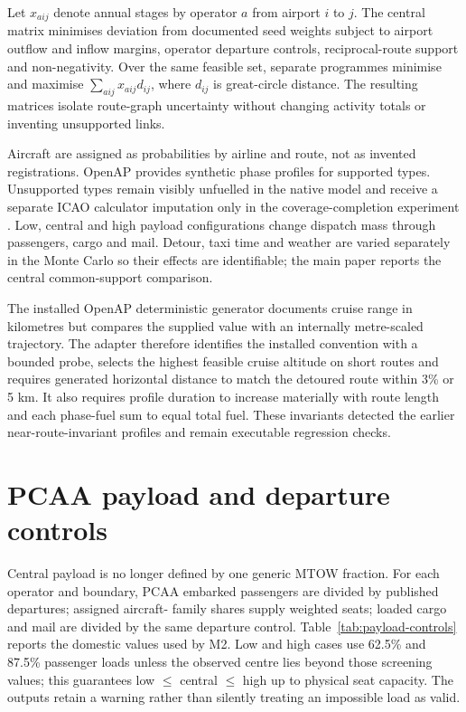 \documentclass[5p,times,authoryear]{elsarticle}
\begin{document}
Let $x_{aij}$ denote annual stages by operator $a$ from airport $i$ to $j$. The central matrix
minimises deviation from documented seed weights subject to airport outflow and inflow margins,
operator departure controls, reciprocal-route support and non-negativity. Over the same
feasible set, separate programmes minimise and maximise $\sum_{aij}x_{aij}d_{ij}$, where
$d_{ij}$ is great-circle distance. The resulting matrices isolate route-graph uncertainty
without changing activity totals or inventing unsupported links.

Aircraft are assigned as probabilities by airline and route, not as invented registrations.
OpenAP \citep{sun2020openap} provides synthetic phase profiles for supported types. Unsupported
types remain visibly unfuelled in the native model and receive a separate ICAO calculator
imputation only in the coverage-completion experiment \citep{icaoicec2024}. Low, central and
high payload configurations change dispatch mass through passengers, cargo and mail. Detour,
taxi time and weather are varied separately in the Monte Carlo so their effects are identifiable;
the main paper reports the central common-support comparison.

The installed OpenAP deterministic generator documents cruise range in kilometres but compares
the supplied value with an internally metre-scaled trajectory. The adapter therefore identifies
the installed convention with a bounded probe, selects the highest feasible cruise altitude on
short routes and requires generated horizontal distance to match the detoured route within 3\%
or 5 km. It also requires profile duration to increase materially with route length and each
phase-fuel sum to equal total fuel. These invariants detected the earlier near-route-invariant
profiles and remain executable regression checks.

\section{PCAA payload and departure controls}

Central payload is no longer defined by one generic MTOW fraction. For each operator and
boundary, PCAA embarked passengers are divided by published departures; assigned aircraft-
family shares supply weighted seats; loaded cargo and mail are divided by the same departure
control. Table~\ref{tab:payload-controls} reports the domestic values used by M2. Low and high
cases use 62.5\% and 87.5\% passenger loads unless the observed centre lies beyond those
screening values; this guarantees low $\leq$ central $\leq$ high up to physical seat capacity.
The outputs retain a warning rather than silently treating an impossible load as valid.
\end{document}
